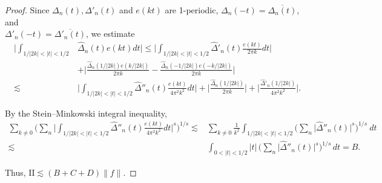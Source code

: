 \documentclass[10pt,a4paper]{amsart}
\begin{document}
\begin{proof}
Since $\Delta_n(t), \Delta'_n(t)$ and $e(kt)$ are 1-periodic, $\Delta_n(-t)=\overline{\Delta_n(t)}$, and\\ $\Delta'_n(-t)=\overline{\Delta'_n(t)}$, we estimate
\begin{align}
\Big| \int_{1/|2k| <|t|<1/2} & \hat \Delta_n(t) e(kt) dt \Big| \le  
 \Big|\int_{1/|2k| <|t|<1/2} \hat \Delta'_n(t) \frac{e(kt)}{2\pi k} dt \Big| \nonumber \\
& + \Big|\frac{\hat \Delta_n(1/|2k| ) e(k/|2k| )}{2\pi k} - \frac{\hat \Delta_n(-1/|2k| ) e(-k/|2k| )}{2\pi k} \Big| \label{eq:1stderivative}\\   %
\lesssim &  \Big| \int_{1/|2k| <|t|<1/2} \hat \Delta''_n(t) \frac{e(kt)}{4\pi^2 k^2} dt \Big| %
  + \Big| \frac{\hat \Delta_n(1/|2k| ) }{2\pi k} \Big| 
  +  \Big| \frac{\hat \Delta'_n(1/|2k| )}{4\pi^2 k^2}\Big|. 
 \nonumber
 \end{align}

By the Stein--Minkowski integral inequality,
\begin{align*}
\sum_{k\neq 0}   \Big( \sum_n  \Big |  \int_{1/|2k|<|t|<1/2} \hat \Delta''_n(t) \frac{e(kt)}{4\pi^2 k^2}  dt \Big |^s \Big)^{1/s} 
\lesssim  & \sum_{k\neq 0} \frac 1{k^2}  \int_{1/|2k|<|t|<1/2} \Big( \sum_n  \Big | \hat \Delta''_n(t) \Big |^s \Big)^{1/s} \ dt  \\
\lesssim & \int_{0<|t|<1/2}  |t| \,  \Big( \sum_n  \Big | \hat \Delta''_n(t) \Big |^s \Big)^{1/s}\, dt  = B .
\end{align*}

Thus, $\mbox{II}\lesssim (B+C+D) \lVert f\rVert$.

\end{proof}
\end{document}
